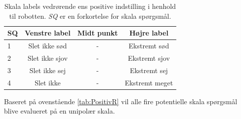 %
\begin{table}[H]
	\centering
	\begin{tabular}{l|c|c|c}
		SQ     & Venstre label & Midt punkt & Højre label \\\hline
		1   & Slet ikke sød & - & Ekstremt sød      \\\hline
		2   & Slet ikke sjov & - & Ekstremt sjov \\\hline
		3   & Slet ikke sej & - & Ekstremt sej \\\hline
		4   & Slet ikke & - & Ekstremt meget
	\end{tabular}
\caption{Skala labels vedrørende ens positive indstilling i henhold til robotten. \textit{SQ} er en forkortelse for skala spørgsmål.}
\label{tab:PositivR} 
\end{table}
\noindent
%
Baseret på ovenstående \autoref{tab:PositivR} vil alle fire potentielle skala spørgsmål blive evalueret på en unipolær skala. 
%
